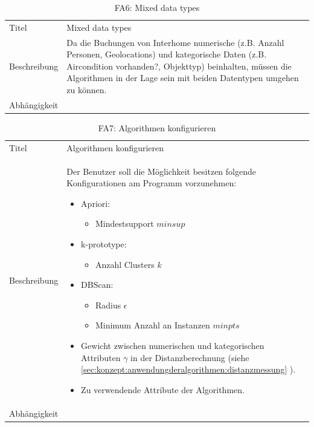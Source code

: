 \begin{table}[H] 
	\caption{FA6: Mixed data types}
	\centering
	\label{fig:anforderungsanalyse:funktionaleanforderung:fa6}
	\begin{tabular}{ | l | L{10cm} | } 
		\hline 
		 \\ \hline 
		Titel & Mixed data types \\ \hline 
		Beschreibung & Da die Buchungen von Interhome numerische (z.B. Anzahl Personen, Geolocations) und kategorische Daten (z.B. Aircondition vorhanden?, Objekttyp) beinhalten, müssen die Algorithmen in der Lage sein mit beiden Datentypen umgehen zu können. \\ \hline 
		Abhängigkeit & \\ \hline 
	\end{tabular}
\end{table}

\begin{table}[H] 
	\caption{FA7: Algorithmen konfigurieren}
	\centering
	\label{fig:anforderungsanalyse:funktionaleanforderung:fa8}
	\begin{tabular}{ | l | L{10cm} | } 
		\hline 
		 \\ \hline 
		Titel & Algorithmen konfigurieren \\ \hline 
		Beschreibung & Der Benutzer soll die Möglichkeit besitzen folgende Konfigurationen am Programm vorzunehmen:
		\begin{itemize}
			\item Apriori:
			\begin{itemize}
				\item Mindestsupport $minsup$
			\end{itemize}
			\item k-prototype:
			\begin{itemize}
				\item Anzahl Clusters $k$
			\end{itemize}
			\item DBScan:
			\begin{itemize}
				\item Radius $\epsilon$
				\item Minimum Anzahl an Instanzen $minpts$
			\end{itemize}
			\item Gewicht zwischen numerischen und kategorischen Attributen $\gamma$ in der Distanzberechnung (siehe \cref{sec:konzept:anwendungderalgorithmen:distanzmessung} ).
			\item Zu verwendende Attribute der Algorithmen.
		\end{itemize}
		 \\ \hline 
		Abhängigkeit & \\ \hline 
	\end{tabular}
\end{table}


